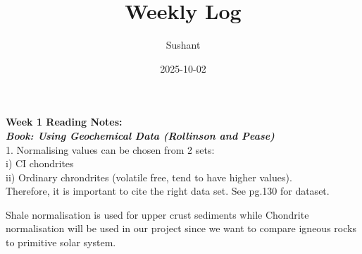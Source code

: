 \documentclass[
]{article}
\title{Weekly Log}
\author{Sushant}
\date{2025-10-02}
\begin{document}
\maketitle

\textbf{Week 1 Reading Notes:}\\
\textbf{\emph{Book: Using Geochemical Data (Rollinson and Pease)}}\\
1. Normalising values can be chosen from 2 sets:\\
i) CI chondrites\\
ii) Ordinary chrondrites (volatile free, tend to have higher values).\\
Therefore, it is important to cite the right data set. See pg.130 for
dataset.

Shale normalisation is used for upper crust sediments while Chondrite
normalisation will be used in our project since we want to compare
igneous rocks to primitive solar system.
\end{document}
